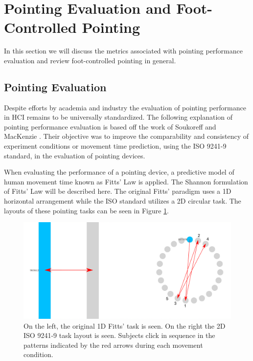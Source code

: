\documentclass [12pt,letterpaper]{report}
\begin{document}


\section{Pointing Evaluation and Foot-Controlled Pointing}

In this section we will discuss the metrics associated with pointing performance evaluation and review foot-controlled pointing in general.

\subsection{Pointing Evaluation} %
\label{pointing_eval}

Despite efforts by academia and industry \cite{soukoreff2004towards} the evaluation of pointing performance in HCI remains to be universally standardized. The following explanation of pointing performance evaluation is based off the work of Soukoreff and MacKenzie \cite{soukoreff2004towards}. Their objective was to improve the comparability and consistency of experiment conditions or movement time prediction, using the ISO 9241-9 standard, in the evaluation of pointing devices.

When evaluating the performance of a pointing device, a predictive model of human movement time known as Fitts' Law \cite{fitts1954information} is applied. The Shannon formulation of Fitts' Law will be described here. The original Fitts' paradigm uses a 1D horizontal arrangement while the ISO standard utilizes a 2D circular task. The layouts of these pointing tasks can be seen in Figure \ref{1D_2D}.


\begin{figure}[tpb]
  \centering
  \includegraphics[scale=0.2]{fig/1D_2D}
  \caption{On the left, the original 1D Fitts' task is seen. On the right the 2D ISO 9241-9 task layout is seen. Subjects click in sequence in the patterns indicated by the red arrows during each movement condition.}
  \label{1D_2D}
\end{figure}
\end{document}
